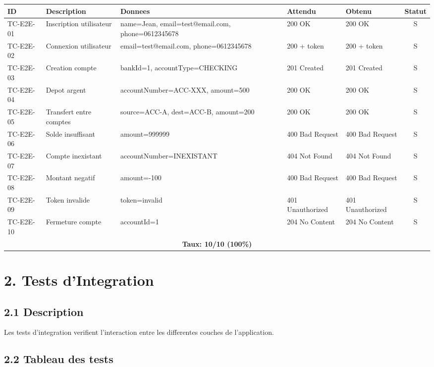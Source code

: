 \documentclass[12pt,a4paper]{article}
\begin{document}
\begin{longtable}{|p{2.2cm}|p{3.8cm}|p{4cm}|p{2.5cm}|p{2.5cm}|c|}
\hline
\rowcolor[gray]{0.9}
\textbf{ID} & \textbf{Description} & \textbf{Donnees} & \textbf{Attendu} & \textbf{Obtenu} & \textbf{Statut} \\
\hline
TC-E2E-01 & Inscription utilisateur & name=Jean, email=test@email.com, phone=0612345678 & 200 OK & 200 OK & S \\
\hline
TC-E2E-02 & Connexion utilisateur & email=test@email.com, phone=0612345678 & 200 + token & 200 + token & S \\
\hline
TC-E2E-03 & Creation compte & bankId=1, accountType=CHECKING & 201 Created & 201 Created & S \\
\hline
TC-E2E-04 & Depot argent & accountNumber=ACC-XXX, amount=500 & 200 OK & 200 OK & S \\
\hline
TC-E2E-05 & Transfert entre comptes & source=ACC-A, dest=ACC-B, amount=200 & 200 OK & 200 OK & S \\
\hline
TC-E2E-06 & Solde insuffisant & amount=999999 & 400 Bad Request & 400 Bad Request & S \\
\hline
TC-E2E-07 & Compte inexistant & accountNumber=INEXISTANT & 404 Not Found & 404 Not Found & S \\
\hline
TC-E2E-08 & Montant negatif & amount=-100 & 400 Bad Request & 400 Bad Request & S \\
\hline
TC-E2E-09 & Token invalide & token=invalid & 401 Unauthorized & 401 Unauthorized & S \\
\hline
TC-E2E-10 & Fermeture compte & accountId=1 & 204 No Content & 204 No Content & S \\
\hline
\multicolumn{6}{|c|}{\textbf{Taux: 10/10 (100\%)}} \\
\hline
\end{longtable}

\newpage

\section*{2. Tests d'Integration}

\subsection*{2.1 Description}
Les tests d'integration verifient l'interaction entre les differentes couches de l'application.

\subsection*{2.2 Tableau des tests}
\end{document}
